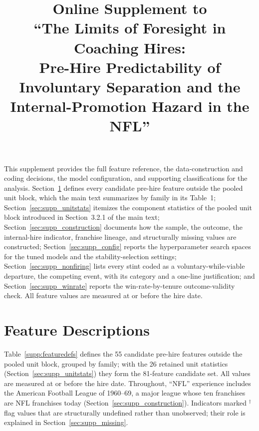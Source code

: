 \documentclass[12pt,USenglish]{article}
\begin{document}
\title{Online Supplement to\\
``The Limits of Foresight in Coaching Hires:\\
Pre-Hire Predictability of Involuntary Separation and the\\
Internal-Promotion Hazard in the NFL''}

\author{}
\date{}
\maketitle

\noindent This supplement provides the full feature reference, the data-construction and coding
decisions, the model configuration, and supporting classifications for the analysis.
Section~\ref{sec:supp_features} defines every candidate pre-hire feature outside the pooled
unit block, which the main text summarizes by family in its Table~1;
Section~\ref{sec:supp_unitstats} itemizes the component statistics of the pooled unit block
introduced in Section~3.2.1 of the main text; Section~\ref{sec:supp_construction} documents
how the sample, the outcome, the internal-hire indicator, franchise lineage, and structurally
missing values are constructed; Section~\ref{sec:supp_config} reports the hyperparameter
search spaces for the tuned models and the stability-selection settings;
Section~\ref{sec:supp_nonfiring} lists every stint coded as a voluntary-while-viable
departure, the competing event, with its category and a one-line justification; and
Section~\ref{sec:supp_winrate} reports the win-rate-by-tenure outcome-validity check. All
feature values are measured at or before the hire date.

\section{Feature Descriptions}
\label{sec:supp_features}

Table~\ref{supp:featuredefs} defines the 55 candidate pre-hire features outside the pooled
unit block, grouped by family; with the 26 retained unit statistics
(Section~\ref{sec:supp_unitstats}) they form the 81-feature candidate set. All values are
measured at or before the hire date. Throughout, ``NFL'' experience includes the American
Football League of 1960--69, a major league whose ten franchises are NFL franchises today
(Section~\ref{sec:supp_construction}). Indicators marked $^{\dagger}$ flag values that are
structurally undefined rather than unobserved; their role is explained in
Section~\ref{sec:supp_missing}.
\end{document}
